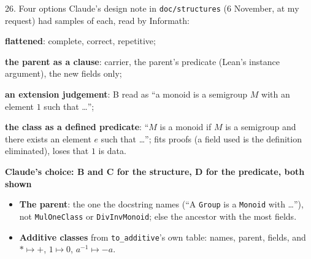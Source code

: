 \documentclass[10pt,aspectratio=169]{beamer}
\newcommand{\decided}[1]{\par\textcolor{gfblue}{\textbf{#1}}\par}
\begin{document}
\begin{frame}{26. Four options}
  \small
  Claude's design note in \texttt{doc/structures} (6 November, at my request) had samples of
  each, read by Informath:
  \begin{description}[(D)]
    \item[(A)] \textbf{flattened}: complete, correct, repetitive;
    \item[(B)] \textbf{the parent as a clause}: carrier, the parent's predicate (Lean's instance
          argument), the new fields only;
    \item[(C)] \textbf{an extension judgement}: B read as ``a monoid is a semigroup $M$ with an
          element $1$ such that \ldots'';
    \item[(D)] \textbf{the class as a defined predicate}: ``$M$ is a monoid if $M$ is a
          semigroup and there exists an element $e$ such that \ldots''; fits proofs (a field
          used is the definition eliminated), loses that $1$ is data.
  \end{description}
  \decided{Claude's choice: B and C for the structure, D for the predicate, both shown}
  \begin{itemize}
    \item \textbf{The parent}: the one the docstring names (``A \texttt{Group} is a
          \texttt{Monoid} with \ldots''), not \texttt{MulOneClass} or \texttt{DivInvMonoid};
          else the ancestor with the most fields.
    \item \textbf{Additive classes} from \texttt{to\_additive}'s own table: names, parent,
          fields, and $* \mapsto +$, $1 \mapsto 0$, $a^{-1} \mapsto -a$.
  \end{itemize}
\end{frame}
\end{document}

